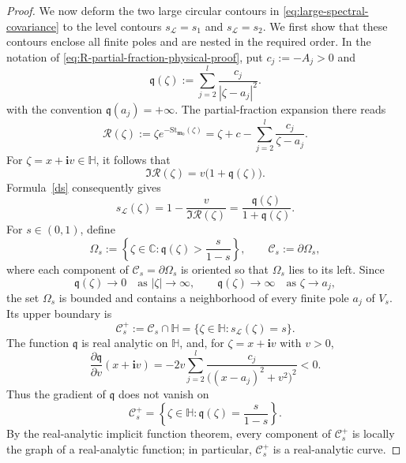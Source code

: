 \documentclass[11pt]{amsart}
\theoremstyle{plain}
\numberwithin{equation}{section}
\numberwithin{theorem}{section}
\numberwithin{figure}{section}
\begin{document}
\begin{proof}
We now deform the two large circular contours in
\eqref{eq:large-spectral-covariance} to the level contours
\(s_{\mathcal L}=s_1\) and \(s_{\mathcal L}=s_2\). We first show that
these contours enclose all finite poles and are nested in the required
order.  In the notation of
\eqref{eq:R-partial-fraction-physical-proof}, put \(c_j:=-A_j>0\) and
\begin{equation}
    \mathfrak q(\zeta)
    :=
    \sum_{j=2}^{l}\frac{c_j}{|\zeta-a_j|^2}.
    \label{eq:spectral-nesting-function}
\end{equation}
with the convention \(\mathfrak q(a_j)=+\infty\).
The partial-fraction expansion there reads
\[
    \mathscr R(\zeta)
    :=
    \zeta e^{-\mathrm{St}_{\mathbf m_0}(\zeta)}
    =
    \zeta+c-\sum_{j=2}^{l}\frac{c_j}{\zeta-a_j}.
\]
For \(\zeta=x+\mathbf i v\in\mathbb H\), it follows that
\[
    \Im\mathscr R(\zeta)
    =v\bigl(1+\mathfrak q(\zeta)\bigr).
\]
Formula~\eqref{ds} consequently gives
\begin{equation}
    s_{\mathcal L}(\zeta)
    =
    1-\frac{v}{\Im\mathscr R(\zeta)}
    =
    \frac{\mathfrak q(\zeta)}{1+\mathfrak q(\zeta)}.
    \label{eq:spectral-level-function}
\end{equation}
For \(s\in(0,1)\), define
\[
    \Omega_s
    :=
    \left\{
        \zeta\in\mathbb C:
        \mathfrak q(\zeta)>\frac{s}{1-s}
    \right\},
    \qquad
    \mathscr C_s:=\partial\Omega_s,
\]
where each component of \(\mathscr C_s=\partial\Omega_s\) is oriented
so that \(\Omega_s\) lies to its left.  Since
\[
    \mathfrak q(\zeta)\longrightarrow0
    \quad\text{as }|\zeta|\to\infty,
    \qquad
    \mathfrak q(\zeta)\longrightarrow\infty
    \quad\text{as }\zeta\to a_j,
\]
the set \(\Omega_s\) is bounded and contains a neighborhood of every
finite pole \(a_j\) of \(V_s\).  Its upper boundary is
\[
    \mathscr C_s^+
    :=
    \mathscr C_s\cap\mathbb H
    =
    \{\zeta\in\mathbb H:s_{\mathcal L}(\zeta)=s\}.
\]
The function \(\mathfrak q\) is real analytic on \(\mathbb H\), and,
for \(\zeta=x+\mathbf i v\) with \(v>0\),
\[
    \frac{\partial\mathfrak q}{\partial v}(x+\mathbf i v)
    =
    -2v\sum_{j=2}^{l}
    \frac{c_j}{\bigl((x-a_j)^2+v^2\bigr)^2}
    <0.
\]
Thus the gradient of \(\mathfrak q\) does not vanish on
\[
    \mathscr C_s^+
    =
    \left\{
        \zeta\in\mathbb H:
        \mathfrak q(\zeta)=\frac{s}{1-s}
    \right\}.
\]
By the real-analytic implicit function theorem, every component of
\(\mathscr C_s^+\) is locally the graph of a real-analytic function;
in particular, \(\mathscr C_s^+\) is a real-analytic curve.

\end{proof}
\end{document}
